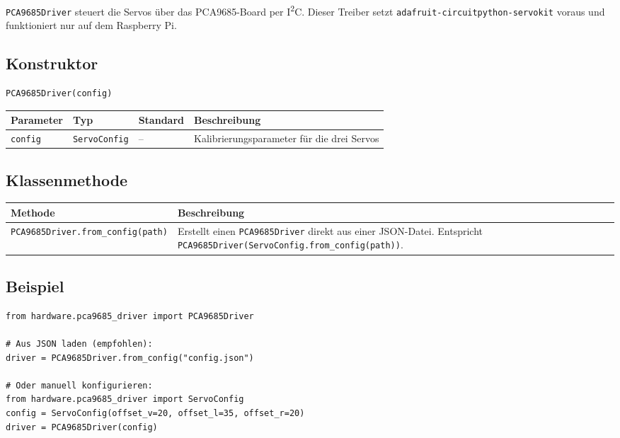 \documentclass[11pt, a4paper]{scrreprt}
\begin{document}
\texttt{PCA9685Driver} steuert die Servos über das PCA9685-Board per I\textsuperscript{2}C.
Dieser Treiber setzt \texttt{adafruit-circuitpython-servokit} voraus
und funktioniert nur auf dem Raspberry Pi.

\subsection*{Konstruktor}

\begin{lstlisting}
PCA9685Driver(config)
\end{lstlisting}

\begin{tabularx}{\textwidth}{l l l X}
  \toprule
  Parameter & Typ & Standard & Beschreibung \\
  \midrule
  \texttt{config} & \texttt{ServoConfig} & – & Kalibrierungsparameter für die drei Servos \\
  \bottomrule
\end{tabularx}

\subsection*{Klassenmethode}

\begin{tabularx}{\textwidth}{l X}
  \toprule
  Methode & Beschreibung \\
  \midrule
  \texttt{PCA9685Driver.from\_config(path)} & Erstellt einen \texttt{PCA9685Driver} direkt aus einer JSON-Datei. Entspricht \texttt{PCA9685Driver(ServoConfig.from\_config(path))}. \\
  \bottomrule
\end{tabularx}

\subsection*{Beispiel}

\begin{lstlisting}
from hardware.pca9685_driver import PCA9685Driver

# Aus JSON laden (empfohlen):
driver = PCA9685Driver.from_config("config.json")

# Oder manuell konfigurieren:
from hardware.pca9685_driver import ServoConfig
config = ServoConfig(offset_v=20, offset_l=35, offset_r=20)
driver = PCA9685Driver(config)
\end{lstlisting}

\end{document}
